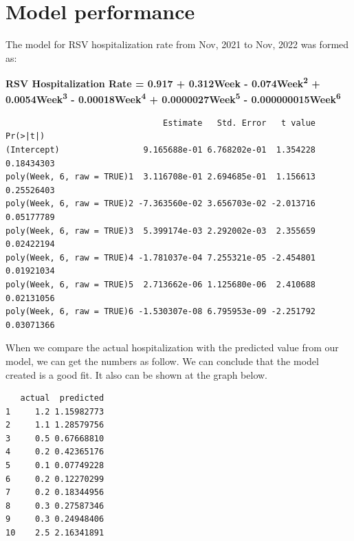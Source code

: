 \documentclass[
  letterpaper,
  DIV=11,
  numbers=noendperiod]{scrreport}
\newenvironment{Shaded}{\begin{snugshade}}{\end{snugshade}}
\newcommand{\AttributeTok}[1]{\textcolor[rgb]{0.40,0.45,0.13}{#1}}
\newcommand{\DecValTok}[1]{\textcolor[rgb]{0.68,0.00,0.00}{#1}}
\newcommand{\FunctionTok}[1]{\textcolor[rgb]{0.28,0.35,0.67}{#1}}
\newcommand{\NormalTok}[1]{\textcolor[rgb]{0.00,0.23,0.31}{#1}}
\newcommand{\OtherTok}[1]{\textcolor[rgb]{0.00,0.23,0.31}{#1}}
\newcommand{\SpecialCharTok}[1]{\textcolor[rgb]{0.37,0.37,0.37}{#1}}
\begin{document}
\hypertarget{model-performance}{%
\section{Model performance}\label{model-performance}}

The model for RSV hospitalization rate from Nov, 2021 to Nov, 2022 was
formed as:

\textbf{RSV Hospitalization Rate = 0.917 + 0.312Week -
0.074Week\textsuperscript{2} + 0.0054Week\textsuperscript{3} -
0.00018Week\textsuperscript{4} + 0.0000027Week\textsuperscript{5} -
0.000000015Week\textsuperscript{6}}

\begin{verbatim}
                                Estimate   Std. Error   t value   Pr(>|t|)
(Intercept)                 9.165688e-01 6.768202e-01  1.354228 0.18434303
poly(Week, 6, raw = TRUE)1  3.116708e-01 2.694685e-01  1.156613 0.25526403
poly(Week, 6, raw = TRUE)2 -7.363560e-02 3.656703e-02 -2.013716 0.05177789
poly(Week, 6, raw = TRUE)3  5.399174e-03 2.292002e-03  2.355659 0.02422194
poly(Week, 6, raw = TRUE)4 -1.781037e-04 7.255321e-05 -2.454801 0.01921034
poly(Week, 6, raw = TRUE)5  2.713662e-06 1.125680e-06  2.410688 0.02131056
poly(Week, 6, raw = TRUE)6 -1.530307e-08 6.795953e-09 -2.251792 0.03071366
\end{verbatim}

When we compare the actual hospitalization with the predicted value from
our model, we can get the numbers as follow. We can conclude that the
model created is a good fit. It also can be shown at the graph below.

\begin{Shaded}
\end{Shaded}

\begin{verbatim}
   actual  predicted
1     1.2 1.15982773
2     1.1 1.28579756
3     0.5 0.67668810
4     0.2 0.42365176
5     0.1 0.07749228
6     0.2 0.12270299
7     0.2 0.18344956
8     0.3 0.27587346
9     0.3 0.24948406
10    2.5 2.16341891
\end{verbatim}
\end{document}
